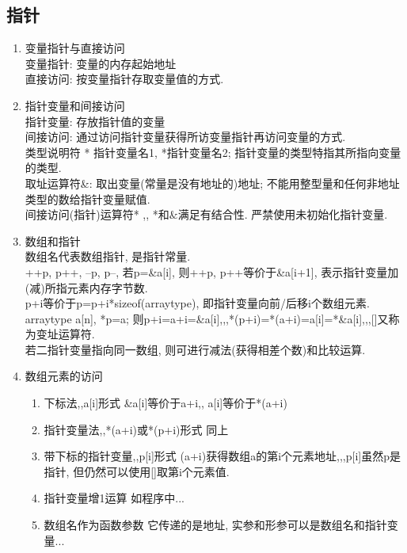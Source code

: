 \documentclass[a4paper,10pt,english]{article}
\begin{document}
\subsection{指针}
\begin{enumerate}
\item {变量指针与直接访问} \\
变量指针: 变量的内存起始地址 \\
直接访问: 按变量指针存取变量值的方式. \\

\item {指针变量和间接访问}\\
指针变量: 存放指针值的变量 \\
间接访问: 通过访问指针变量获得所访变量指针再访问变量的方式. \\
类型说明符 * 指针变量名1, *指针变量名2; 指针变量的类型特指其所指向变量的类型. \\
取址运算符\&: 取出变量(常量是没有地址的)地址; 不能用整型量和任何非地址类型的数给指针变量赋值. \\
间接访问(指针)运算符* ,, *和$\&$满足有结合性. 严禁使用未初始化指针变量.

\item {数组和指针}\\
数组名代表数组指针, 是指针常量. \\
++p, p++, --p, p--, 若p=\&a[i], 则++p, p++等价于\&a[i+1], 表示指针变量加(减)所指元素内存字节数. \\
p+i等价于p=p+i*sizeof(arraytype), 即指针变量向前/后移i个数组元素. \\
arraytype a[n], *p=a; 则p+i=a+i=\&a[i],,,*(p+i)=*(a+i)=a[i]=*\&a[i],,,[]又称为变址运算符. \\
若二指针变量指向同一数组, 则可进行减法(获得相差个数)和比较运算. \\

\item {数组元素的访问}
\begin{enumerate}
\item {下标法,,a[i]形式}
\&a[i]等价于a+i,, a[i]等价于*(a+i)

\item {指针变量法,,*(a+i)或*(p+i)形式}
同上

\item {带下标的指针变量,,p[i]形式}
(a+i)获得数组a的第i个元素地址,,,p[i]虽然p是指针, 但仍然可以使用[]取第i个元素值.

\item {指针变量增1运算}
如程序中...

\item {数组名作为函数参数}
它传递的是地址, 实参和形参可以是数组名和指针变量...


\end{enumerate}
\end{enumerate}
\end{document}
